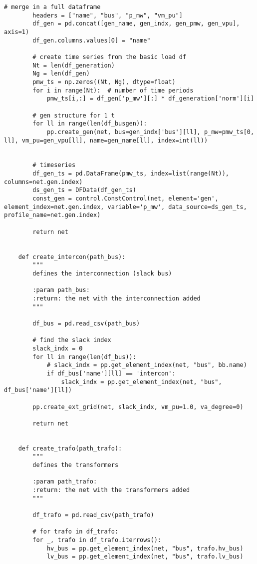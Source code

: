 \begin{lstlisting}[caption={Main code in Python with the Pandapower library}]
        # merge in a full dataframe
        headers = ["name", "bus", "p_mw", "vm_pu"]
        df_gen = pd.concat([gen_name, gen_indx, gen_pmw, gen_vpu], axis=1)
        df_gen.columns.values[0] = "name"

        # create time series from the basic load df
        Nt = len(df_generation)
        Ng = len(df_gen)
        pmw_ts = np.zeros((Nt, Ng), dtype=float)
        for i in range(Nt):  # number of time periods
            pmw_ts[i,:] = df_gen['p_mw'][:] * df_generation['norm'][i]

        # gen structure for 1 t
        for ll in range(len(df_busgen)):
            pp.create_gen(net, bus=gen_indx['bus'][ll], p_mw=pmw_ts[0, ll], vm_pu=gen_vpu[ll], name=gen_name[ll], index=int(ll))


        # timeseries
        df_gen_ts = pd.DataFrame(pmw_ts, index=list(range(Nt)), columns=net.gen.index)
        ds_gen_ts = DFData(df_gen_ts)
        const_gen = control.ConstControl(net, element='gen', element_index=net.gen.index, variable='p_mw', data_source=ds_gen_ts, profile_name=net.gen.index)

        return net


    def create_intercon(path_bus):
        """
        defines the interconnection (slack bus)

        :param path_bus:
        :return: the net with the interconnection added
        """

        df_bus = pd.read_csv(path_bus)

        # find the slack index
        slack_indx = 0
        for ll in range(len(df_bus)):
            # slack_indx = pp.get_element_index(net, "bus", bb.name)
            if df_bus['name'][ll] == 'intercon':
                slack_indx = pp.get_element_index(net, "bus", df_bus['name'][ll])

        pp.create_ext_grid(net, slack_indx, vm_pu=1.0, va_degree=0)

        return net


    def create_trafo(path_trafo):
        """
        defines the transformers

        :param path_trafo:
        :return: the net with the transformers added
        """

        df_trafo = pd.read_csv(path_trafo)

        # for trafo in df_trafo:
        for _, trafo in df_trafo.iterrows():
            hv_bus = pp.get_element_index(net, "bus", trafo.hv_bus)
            lv_bus = pp.get_element_index(net, "bus", trafo.lv_bus)


\end{lstlisting}
